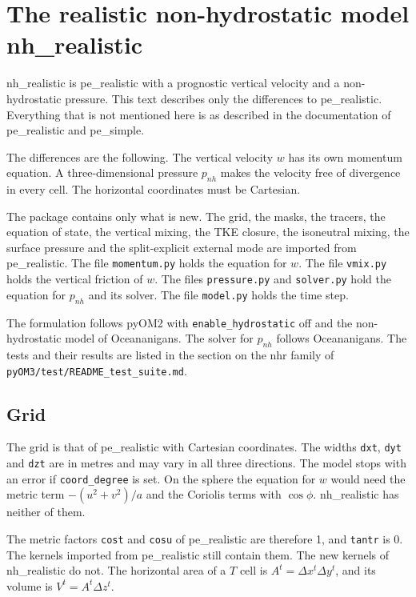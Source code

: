 \documentclass[12pt]{article}
\begin{document}
 \section*{The realistic non-hydrostatic model nh\_realistic}

nh\_realistic is pe\_realistic with a prognostic vertical velocity and a non-hydrostatic pressure.
This text describes only the differences to pe\_realistic.
Everything that is not mentioned here is as described in the documentation of pe\_realistic and pe\_simple.

The differences are the following.
The vertical velocity $w$ has its own momentum equation.
A three-dimensional pressure $p_{nh}$ makes the velocity free of divergence in every cell.
The horizontal coordinates must be Cartesian.

The package contains only what is new.
The grid, the masks, the tracers, the equation of state, the vertical mixing, the TKE closure, the isoneutral mixing, the surface pressure and the split-explicit external mode are imported from pe\_realistic.
The file \verb|momentum.py| holds the equation for $w$.
The file \verb|vmix.py| holds the vertical friction of $w$.
The files \verb|pressure.py| and \verb|solver.py| hold the equation for $p_{nh}$ and its solver.
The file \verb|model.py| holds the time step.

The formulation follows pyOM2 with \verb|enable_hydrostatic| off and the non-hydrostatic model of Oceananigans.
The solver for $p_{nh}$ follows Oceananigans.
The tests and their results are listed in the section on the nhr family of \verb|pyOM3/test/README_test_suite.md|.

\subsection*{Grid}

The grid is that of pe\_realistic with Cartesian coordinates.
The widths \verb|dxt|, \verb|dyt| and \verb|dzt| are in metres and may vary in all three directions.
The model stops with an error if \verb|coord_degree| is set.
On the sphere the equation for $w$ would need the metric term $-(u^2+v^2)/a$ and the Coriolis terms with $\cos \phi$.
nh\_realistic has neither of them.

The metric factors \verb|cost| and \verb|cosu| of pe\_realistic are therefore 1, and \verb|tantr| is 0.
The kernels imported from pe\_realistic still contain them.
The new kernels of nh\_realistic do not.
The horizontal area of a $T$ cell is $A^t = \Delta x^t \Delta y^t$, and its volume is $V^t = A^t \Delta z^t$.
\end{document}
